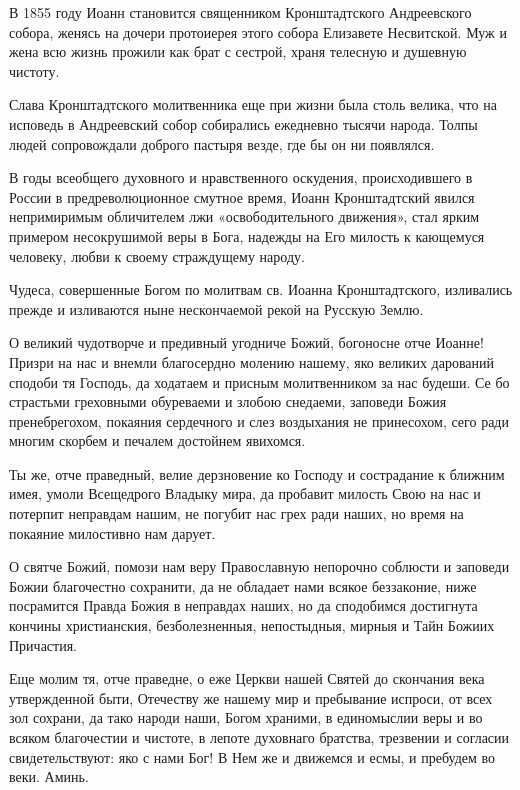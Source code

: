 В 1855 году Иоанн становится священником Кронштадтского Андреевского собора, женясь на дочери протоиерея этого собора Елизавете Несвитской. Муж и жена всю жизнь прожили как брат с сестрой, храня телесную и душевную чистоту. 


Слава Кронштадтского молитвенника еще при жизни была столь велика, что на исповедь в Андреевский собор собирались ежедневно тысячи народа. Толпы людей сопровождали доброго пастыря везде, где бы он ни появлялся. 


В годы всеобщего духовного и нравственного оскудения, происходившего в России в предреволюционное смутное время, Иоанн Кронштадтский явился непримиримым обличителем лжи «освободительного движения», стал ярким примером несокрушимой веры в Бога, надежды на Его милость к кающемуся человеку, любви к своему страждущему народу. 


Чудеса, совершенные Богом по молитвам св. Иоанна Кронштадтского, изливались прежде и изливаются ныне нескончаемой рекой на Русскую Землю.




О великий чудотворче и предивный угодниче Божий, богоносне отче Иоанне! Призри на нас и внемли благосердно молению нашему, яко великих дарований сподоби тя Господь, да ходатаем и присным молитвенником за нас будеши. Се бо страстьми греховными обуреваеми и злобою снедаеми, заповеди Божия пренебрегохом, покаяния сердечного и слез воздыхания не принесохом, сего ради многим скорбем и печалем достойнем явихомся. 


Ты же, отче праведный, велие дерзновение ко Господу и сострадание к ближним имея, умоли Всещедрого Владыку мира, да пробавит милость Свою на нас и потерпит неправдам нашим, не погубит нас грех ради наших, но время на покаяние милостивно нам дарует. 


О святче Божий, помози нам веру Православную непорочно соблюсти и заповеди Божии благочестно сохранити, да не обладает нами всякое беззаконие, ниже посрамится Правда Божия в неправдах наших, но да сподобимся достигнута кончины христианския, безболезненныя, непостыдныя, мирныя и Тайн Божиих Причастия. 


Еще молим тя, отче праведне, о еже Церкви нашей Святей до скончания века утвержденной быти, Отечеству же нашему мир и пребывание испроси, от всех зол сохрани, да тако народи наши, Богом храними, в единомыслии веры и во всяком благочестии и чистоте, в лепоте духовнаго братства, трезвении и согласии свидетельствуют: яко с нами Бог! В Нем же и движемся и есмы, и пребудем во веки. Аминь.\mychapterending

